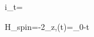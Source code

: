 i\hbar\partial_t\Psi=\Psi

H_{\rm spin}=-\frac{\hbar\omega}2\sigma_z,\qquad \phi(t)=\phi_0-\omega t
